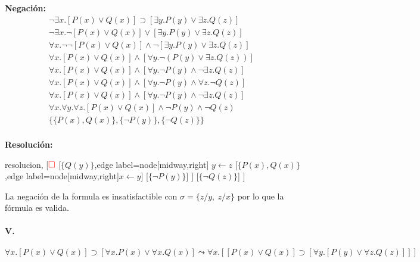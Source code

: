 \documentclass[10pt,a4paper]{article}
\begin{document}
\begin{multicols}{2}
\textbf{Negación:}
\begin{align*}
\lnot\exists x.[P(x) \lor Q(x)] \supset [\exists y.P(y) \lor \exists z.Q(z)] & \\[1pt]
\lnot\exists x.\lnot [P(x) \lor Q(x)] \lor [\exists y.P(y) \lor \exists z.Q(z)] & \\[1pt]
\forall x.\lnot\lnot [P(x) \lor Q(x)] \land \lnot[\exists y.P(y) \lor \exists z.Q(z)] & \\[1pt]
\forall x.[P(x) \lor Q(x)] \land [\forall y.\lnot(P(y) \lor \exists z.Q(z))] & \\[1pt]
\forall x.[P(x) \lor Q(x)] \land [\forall y.\lnot P(y) \land \lnot\exists z.Q(z)] & \\[1pt]
\forall x.[P(x) \lor Q(x)] \land [\forall y.\lnot P(y) \land \forall z.\lnot Q(z)] & \\[1pt]
\forall x.[P(x) \lor Q(x)] \land [\forall y.\lnot P(y) \land \lnot\exists z.Q(z)] & \\[1pt]
\forall x.\forall y.\forall z.[P(x) \lor Q(x)] \land \lnot P(y) \land \lnot Q(z) & \\[1pt]
\{\{P(x),Q(x)\}, \{\lnot P(y)\}, \{\lnot Q(z)\}\}  \\[1pt]
\end{align*}

\textbf{Resolución:}
\begin{center}
	\begin{forest} resolucion,
[${\color{red}\Box}$ 
	[$\{Q(y)\}$,edge label={node[midway,right] {$y\leftarrow z$}}
	    [$\{P(x) \comma Q(x)\}$
	    ,edge label={node[midway,right]{$x\leftarrow y$}}]
	    [$\{\lnot P(y)\}$]
	]
	[$\{\lnot Q(z)\}$]
]
	\end{forest}
\end{center}
La negación de la formula es insatisfactible con $\sigma = \{ z/y,~z/x\}$ por lo que la fórmula es valida.
\end{multicols}

\paragraph{V.}$ \forall x. [P(x) \lor Q(x)] \supset [\forall x. P(x) \lor \forall x. Q(x)] \leadsto \forall x. [[P(x) \lor Q(x)] \supset [\forall y. [P(y) \lor \forall z. Q(z)]]]$
\end{document}
